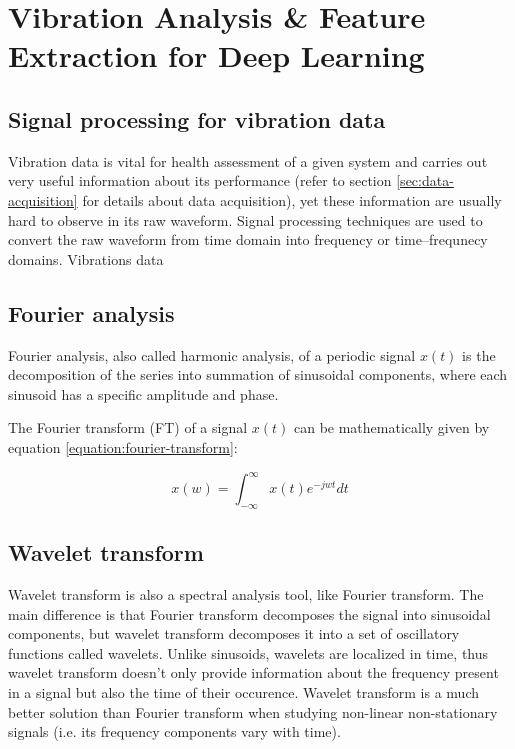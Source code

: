 \chapter{Vibration Analysis & Feature Extraction for Deep Learning}


\section{Signal processing for vibration data}
Vibration data is vital for health assessment of a given system and carries out very useful information about its performance (refer to section \ref{sec:data-acquisition} for details about data acquisition), yet these information are usually hard to observe in its raw waveform. Signal processing techniques are used to convert the raw waveform from time domain into frequency or time–frequnecy domains.
Vibrations data 

\section{Fourier analysis}
Fourier analysis, also called harmonic analysis, of a periodic signal $x(t)$ is the decomposition of the series into summation of sinusoidal components, where each sinusoid has a specific amplitude and phase.

The Fourier transform (FT) of a signal $x(t)$ can be mathematically given by equation \ref{equation:fourier-transform}:

\begin{equation}
    x(w) = \int_{-\infty}^{\infty}x(t)e^{-jwt}dt
    \label{equation:fourier-transform}
\end{equation}

\section{Wavelet transform}
Wavelet transform is also a spectral analysis tool, like Fourier transform. The main difference is that Fourier transform decomposes the signal into sinusoidal components, but wavelet transform decomposes it into a set of oscillatory functions called wavelets. Unlike sinusoids, wavelets are localized in time, thus wavelet transform doesn't only provide information about the frequency present in a signal but also the time of their occurence. Wavelet transform is a much better solution than Fourier transform when studying non-linear non-stationary signals (i.e. its frequency components vary with time).

